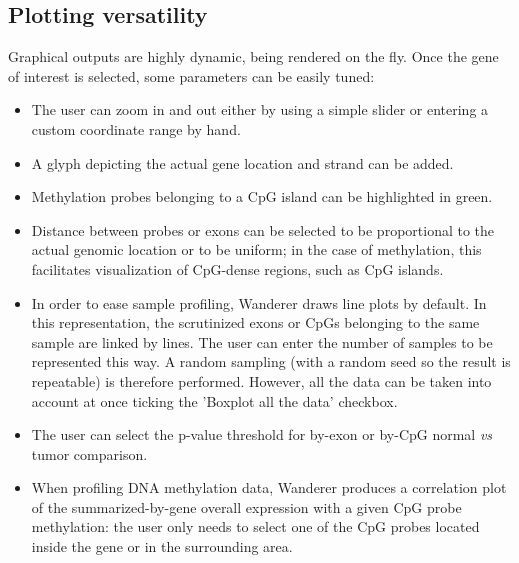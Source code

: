 \documentclass{bmcart}
\begin{document}
\subsection*{Plotting versatility}

Graphical outputs are highly dynamic, being rendered on the fly. {\color{red} Once the gene of interest is selected, some parameters can be easily tuned: }

\begin{itemize}
\item The user can zoom in and out either by using a simple slider or entering a custom coordinate range by hand. 
\item A glyph depicting the actual gene location and strand can be added. 
\item Methylation probes belonging to a CpG island can be highlighted in green. 
\item Distance between probes or exons can be selected to be proportional to the actual genomic location or to be uniform; in the case of methylation, this facilitates visualization of CpG-dense regions, such as CpG islands. 
\item In order to ease sample profiling, Wanderer draws line plots by default. In this representation, the scrutinized exons or CpGs belonging to the same sample are linked by lines. The user can enter the number of samples to be represented this way. A random sampling (with a random seed so the result is repeatable) is therefore performed. However, all the data can be taken into account at once ticking the 'Boxplot all the data' checkbox.
\item {\color{red} The user can select the p-value threshold for by-exon or by-CpG normal \textit{vs} tumor comparison.}
\item {\color{red} When profiling DNA methylation data, Wanderer produces a correlation plot of the summarized-by-gene overall expression with a given CpG probe methylation: the user only needs to select one of the CpG probes located inside the gene or in the surrounding area.}
\end{itemize}
\end{document}
